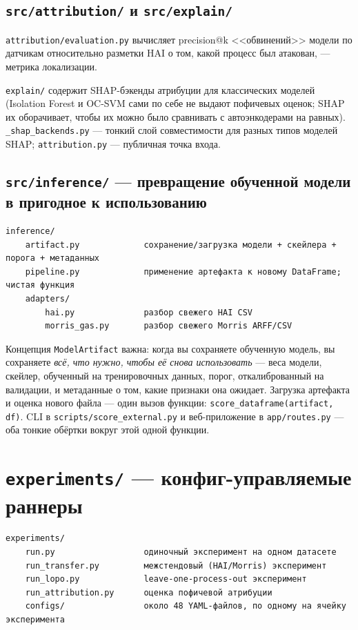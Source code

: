 \documentclass[11pt,a4paper]{article}
\newcommand{\code}[1]{\texttt{#1}}
\begin{document}
\subsection{\texttt{src/attribution/} и \texttt{src/explain/}}

\code{attribution/evaluation.py} вычисляет precision@k <<обвинений>> модели по датчикам относительно разметки HAI о том, какой процесс был атакован, --- метрика локализации.

\code{explain/} содержит SHAP-бэкенды атрибуции для классических моделей (Isolation Forest и OC-SVM сами по себе не выдают пофичевых оценок; SHAP их оборачивает, чтобы их можно было сравнивать с автоэнкодерами на равных). \code{\_shap\_backends.py} --- тонкий слой совместимости для разных типов моделей SHAP; \code{attribution.py} --- публичная точка входа.

\subsection{\texttt{src/inference/} --- превращение обученной модели в пригодное к использованию}

\begin{Verbatim}
inference/
    artifact.py             сохранение/загрузка модели + скейлера + порога + метаданных
    pipeline.py             применение артефакта к новому DataFrame; чистая функция
    adapters/
        hai.py              разбор свежего HAI CSV
        morris_gas.py       разбор свежего Morris ARFF/CSV
\end{Verbatim}

Концепция \code{ModelArtifact} важна: когда вы сохраняете обученную модель, вы сохраняете \emph{всё, что нужно, чтобы её снова использовать} --- веса модели, скейлер, обученный на тренировочных данных, порог, откалиброванный на валидации, и метаданные о том, какие признаки она ожидает. Загрузка артефакта и оценка нового файла --- один вызов функции: \code{score\_dataframe(artifact, df)}. CLI в \code{scripts/score\_external.py} и веб-приложение в \code{app/routes.py} --- оба тонкие обёртки вокруг этой одной функции.

\section{\texttt{experiments/} --- конфиг-управляемые раннеры}

\begin{Verbatim}
experiments/
    run.py                  одиночный эксперимент на одном датасете
    run_transfer.py         межстендовый (HAI/Morris) эксперимент
    run_lopo.py             leave-one-process-out эксперимент
    run_attribution.py      оценка пофичевой атрибуции
    configs/                около 48 YAML-файлов, по одному на ячейку эксперимента
\end{Verbatim}
\end{document}
